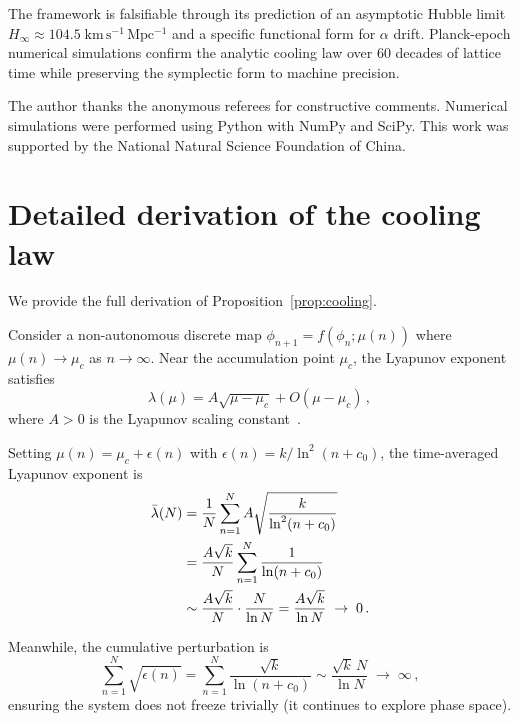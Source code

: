 \documentclass[twocolumn,showpacs,preprintnumbers,amsmath,amssymb,prd]{revtex4-2}
\newcommand{\lnq}{\ln^2}
\newcommand{\Hinf}{H_{\infty}}
\begin{document}
The framework is falsifiable through its prediction of an
asymptotic Hubble limit $\Hinf \approx 104.5\;\mathrm{km\,s^{-1}\,Mpc^{-1}}$
and a specific functional form for $\alpha$ drift.
Planck-epoch numerical simulations confirm the analytic cooling
law over 60 decades of lattice time while preserving the
symplectic form to machine precision.

\begin{acknowledgments}
The author thanks the anonymous referees for constructive comments.
Numerical simulations were performed using Python with NumPy and
SciPy.
This work was supported by the National Natural Science Foundation
of China.
\end{acknowledgments}



\appendix

\section{Detailed derivation of the cooling law}
\label{app:cooling}

We provide the full derivation of
Proposition~\ref{prop:cooling}.

Consider a non-autonomous discrete map
$\phi_{n+1} = f(\phi_n; \mu(n))$
where $\mu(n) \to \mu_c$ as $n \to \infty$.
Near the accumulation point $\mu_c$, the Lyapunov exponent
satisfies
\begin{equation}
  \lambda(\mu) = A\sqrt{\mu - \mu_c} + O(\mu - \mu_c)\,,
\end{equation}
where $A > 0$ is the Lyapunov scaling constant~\cite{Feigenbaum1978}.

Setting $\mu(n) = \mu_c + \epsilon(n)$ with
$\epsilon(n) = k/\lnq(n+c_0)$, the time-averaged Lyapunov
exponent is
\begin{align}
  \bar\lambda(N) &= \frac{1}{N}\sum_{n=1}^N
    A\sqrt{\frac{k}{\lnq(n+c_0)}} \notag \\
  &= \frac{A\sqrt{k}}{N}\sum_{n=1}^N \frac{1}{\ln(n+c_0)} \notag \\
  &\sim \frac{A\sqrt{k}}{N}\cdot\frac{N}{\ln N}
  = \frac{A\sqrt{k}}{\ln N} \;\to\; 0\,.
  \label{eq:lyap_avg}
\end{align}

Meanwhile, the cumulative perturbation is
\begin{equation}
  \sum_{n=1}^N \sqrt{\epsilon(n)} = \sum_{n=1}^N \frac{\sqrt{k}}{\ln(n+c_0)}
  \sim \frac{\sqrt{k}\,N}{\ln N} \;\to\; \infty\,,
\end{equation}
ensuring the system does not freeze trivially (it continues to
explore phase space).
\end{document}
